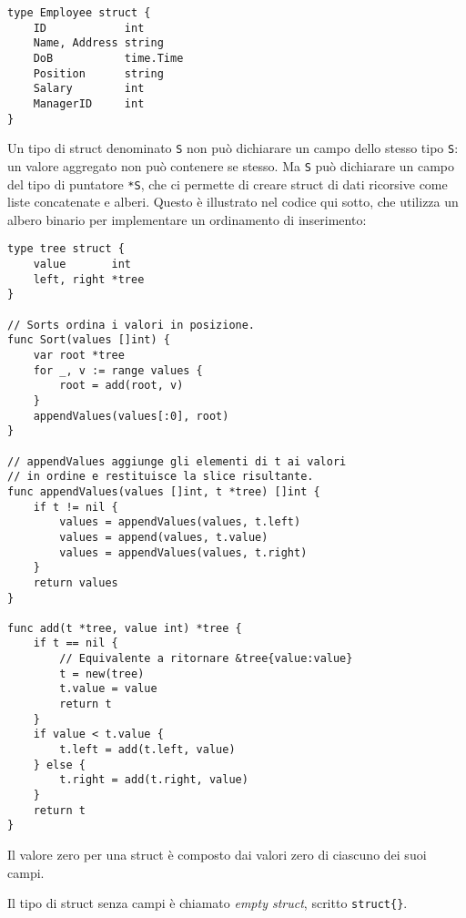 \documentclass[../../thesis.tex]{subfiles}
\begin{document}
    \begin{lstlisting}[frame = single, label = {lst:lstlisting3-4.6}]
type Employee struct {
    ID            int
    Name, Address string
    DoB           time.Time
    Position      string
    Salary        int
    ManagerID     int
}
    \end{lstlisting}
    Un tipo di struct denominato \verb"S" non può dichiarare un campo dello stesso tipo \verb"S": un valore aggregato non può contenere se stesso.
    Ma \verb"S" può dichiarare un campo del tipo di puntatore \verb"*S", che ci permette di creare struct di dati ricorsive come liste concatenate e alberi.
    Questo è illustrato nel codice qui sotto, che utilizza un albero binario per implementare un ordinamento di inserimento:
    \begin{lstlisting}[frame = single, label = {lst:lstlisting3-4.7}]
type tree struct {
    value       int
    left, right *tree
}

// Sorts ordina i valori in posizione.
func Sort(values []int) {
    var root *tree
    for _, v := range values {
        root = add(root, v)
    }
    appendValues(values[:0], root)
}

// appendValues aggiunge gli elementi di t ai valori
// in ordine e restituisce la slice risultante.
func appendValues(values []int, t *tree) []int {
    if t != nil {
        values = appendValues(values, t.left)
        values = append(values, t.value)
        values = appendValues(values, t.right)
    }
    return values
}

func add(t *tree, value int) *tree {
    if t == nil {
        // Equivalente a ritornare &tree{value:value}
        t = new(tree)
        t.value = value
        return t
    }
    if value < t.value {
        t.left = add(t.left, value)
    } else {
        t.right = add(t.right, value)
    }
    return t
}
    \end{lstlisting}
    Il valore zero per una struct è composto dai valori zero di ciascuno dei suoi campi.

    Il tipo di struct senza campi è chiamato \textit{empty struct}, scritto \verb"struct{}".
    
    
    
\end{document}
